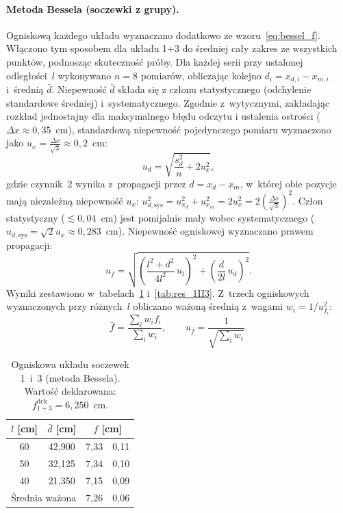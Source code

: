 \documentclass[12pt, a4paper]{article}
\begin{document}
\paragraph{Metoda Bessela (soczewki z grupy).}
Ogniskową każdego układu wyznaczano dodatkowo ze wzoru~\eqref{eq:bessel_f}. Włączono tym sposobem dla układu 1+3 do średniej cały zakres ze wszystkich punktów, podnosząc skuteczność próby.
Dla każdej serii przy ustalonej odległości~$l$ wykonywano $n=8$ pomiarów,
obliczając kolejno $d_i = x_{d,i} - x_{m,i}$ i~średnią $\bar{d}$.
Niepewność $\bar{d}$ składa się z członu statystycznego (odchylenie standardowe
średniej) i~systematycznego. Zgodnie z~wytycznymi, zakładając rozkład jednostajny dla maksymalnego błędu odczytu i ustalenia ostrości ($\Delta x \approx 0{,}35$~cm), standardową niepewność pojedynczego pomiaru wyznaczono jako $u_x = \frac{\Delta x}{\sqrt{3}} \approx 0{,}2$~cm:
\begin{equation}
    u_d = \sqrt{\frac{s_d^2}{n} + 2u_x^2},
    \label{eq:ud}
\end{equation}
gdzie czynnik~2 wynika z~propagacji przez $d = x_d - x_m$, w~której obie pozycje
mają niezależną niepewność $u_x$: $u_{d,\text{sys}}^2 = u_{x_d}^2 + u_{x_m}^2 = 2u_x^2 = 2{\left(\frac{\Delta x}{\sqrt{3}}\right)}^{\!2}$.
Człon statystyczny (${\lesssim}0{,}04$~cm) jest pomijalnie mały wobec
systematycznego ($u_{d,\text{sys}} = \sqrt{2}u_x \approx 0{,}283$~cm).
Niepewność ogniskowej wyznaczano prawem propagacji:
\begin{equation}
    u_f = \sqrt{{\left(\frac{l^2+d^2}{4l^2}\,u_l\right)}^{\!2}
              + {\left(\frac{d}{2l}\,u_d\right)}^{\!2}}.
    \label{eq:uf_bessel}
\end{equation}
Wyniki zestawiono w~tabelach~\ref{tab:res_13} i~\ref{tab:res_1II3}.
Z~trzech ogniskowych wyznaczonych przy różnych~$l$ obliczano ważoną średnią
z~wagami $w_i = 1/u_{f_i}^2$:
\begin{equation}
    \bar{f} = \frac{\sum_i w_i f_i}{\sum_i w_i},
    \qquad
    u_{\bar{f}} = \frac{1}{\sqrt{\sum_i w_i}}.
    \label{eq:weighted_mean}
\end{equation}

\begin{table}[H]
\centering
\caption{Ogniskowa układu soczewek 1~i~3 (metoda Bessela).
         Wartość deklarowana: $f_{1+3}^{\mathrm{dek}} = 6{,}250$~cm.}\label{tab:res_13}
\begin{tabular}{c c r @{\;$\pm$\;} r}
\toprule
$l$ [cm] & $\bar{d}$ [cm] & \multicolumn{2}{c}{$f$ [cm]} \\
\midrule
60 & 42{,}900 & 7{,}33 & 0{,}11 \\
50 & 32{,}125 & 7{,}34 & 0{,}10 \\
40 & 21{,}350 & 7{,}15 & 0{,}09 \\
\midrule
\multicolumn{2}{l}{Średnia ważona} & 7{,}26 & 0{,}06 \\
\bottomrule
\end{tabular}
\end{table}
\end{document}
